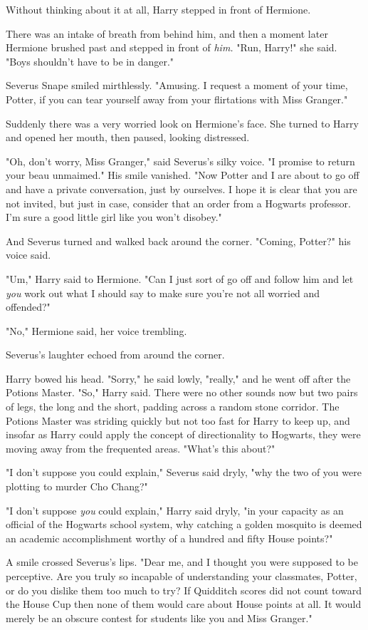 Without thinking about it at all, Harry stepped in front of Hermione.

There was an intake of breath from behind him, and then a moment later Hermione
brushed past and stepped in front of \emph{him.} "Run, Harry!" she said. "Boys
shouldn't have to be in danger."

Severus Snape smiled mirthlessly. "Amusing. I request a moment of your time,
Potter, if you can tear yourself away from your flirtations with Miss Granger."

Suddenly there was a very worried look on Hermione's face. She turned to Harry
and opened her mouth, then paused, looking distressed.

"Oh, don't worry, Miss Granger," said Severus's silky voice. "I promise to
return your beau unmaimed." His smile vanished. "Now Potter and I are about to
go off and have a private conversation, just by ourselves. I hope it is clear
that you are not invited, but just in case, consider that an order from a
Hogwarts professor. I'm sure a good little girl like you won't disobey."

And Severus turned and walked back around the corner. "Coming, Potter?" his
voice said.

"Um," Harry said to Hermione. "Can I just sort of go off and follow him and let
\emph{you} work out what I should say to make sure you're not all worried and
offended?"

"No," Hermione said, her voice trembling.

Severus's laughter echoed from around the corner.

Harry bowed his head. "Sorry," he said lowly, "really," and he went off after
the Potions Master.
\sbreak
"So," Harry said. There were no other sounds now but two pairs of legs, the
long and the short, padding across a random stone corridor. The Potions Master
was striding quickly but not too fast for Harry to keep up, and insofar as
Harry could apply the concept of directionality to Hogwarts, they were moving
away from the frequented areas. "What's this about?"

"I don't suppose you could explain," Severus said dryly, "why the two of you
were plotting to murder Cho Chang?"

"I don't suppose \emph{you} could explain," Harry said dryly, "in your capacity
as an official of the Hogwarts school system, why catching a golden mosquito is
deemed an academic accomplishment worthy of a hundred and fifty House points?"

A smile crossed Severus's lips. "Dear me, and I thought you were supposed to be
perceptive. Are you truly so incapable of understanding your classmates,
Potter, or do you dislike them too much to try? If Quidditch scores did not
count toward the House Cup then none of them would care about House points at
all. It would merely be an obscure contest for students like you and Miss
Granger."

